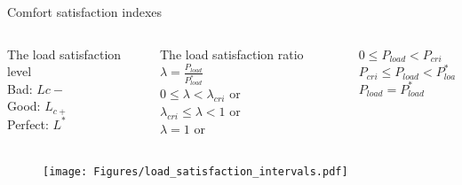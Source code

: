 \documentclass{beamer}
\begin{document}
\begin{frame}{Comfort satisfaction indexes}



\begin{columns}

    \begin{column}{0.3\textwidth}
    \begin{center}
    The load satisfaction level\\\vspace{12px}
            Bad: $L{c-}$\\ \vspace{6px}
            Good: $L_{c+}$\\\vspace{6px}
            Perfect: $L^*$
        \end{center}
        
    \end{column}
    \begin{column}{0.4\textwidth}
        \begin{center}
           The load satisfaction ratio  $\lambda = \frac{P_{load}}{P_{load}^*}$\\ \vspace{10px}
            $0 \leq \lambda<\lambda_{cri}$ \quad\qquad or \\ \vspace{6px}
            $\lambda_{cri}\leq \lambda < 1$ \quad\qquad  or \\\vspace{6px}
            $\lambda=1$ \hspace{65px}or 
        \end{center}
        
    \end{column}
    
    \begin{column}{0.35\textwidth}
    \vspace{40px}
    \begin{center}
            $0\leq P_{load}<P_{cri}$\\ \vspace{5px}
            $P_{cri}\leq P_{load}<P_{load}^*$\\\vspace{5px}
            $P_{load}=P_{load}^*$
        \end{center}
        
    \end{column}
    
\end{columns}

\begin{figure}[!ht]
        \begin{center}
                \texttt{[image: Figures/load\_satisfaction\_intervals.pdf]}
        \end{center}
        \end{figure}
    
    
\end{frame}
\end{document}

